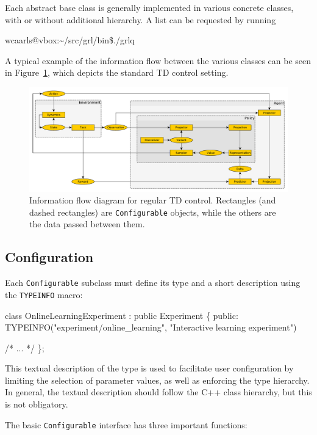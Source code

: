 \documentclass{article}
\makeatletter
\newcommand{\txt}[1]{\texttt{#1}}
\newcommand{\promptmn}{wcaarls@vbox:\~{}/src/grl/bin\$\xspace}
\newenvironment{code}{\alltt}{\endalltt}
\makeatother
\begin{document}
Each abstract base class is generally implemented in various concrete
classes, with or without additional hierarchy. A list can be requested by
running 

\begin{code}
\promptmn ./grlq
\end{code}

A typical example of the information flow between the various classes can be seen in Figure~\ref{fig:td},
which depicts the standard TD control setting.

\begin{figure}
\includegraphics[width=\linewidth]{td.pdf}
\caption{Information flow diagram for regular TD control. Rectangles (and
dashed rectangles) are \txt{Configurable} objects, while the others are the
data passed between them.}
\label{fig:td}
\end{figure}

\subsection{Configuration}

Each \txt{Configurable} subclass must define its type and a short
description using the \txt{TYPEINFO} macro:

\begin{code}
class OnlineLearningExperiment : public Experiment
\{
  public:
    TYPEINFO("experiment/online_learning", "Interactive learning experiment")
  
  /* ... */
\};
\end{code}

This textual description of the type is used to facilitate user
configuration by limiting the selection of parameter values, as well as enforcing the type
hierarchy. In general, the textual description should follow the C++ class
hierarchy, but this is not obligatory.

The basic \txt{Configurable} interface has three important functions:
\end{document}
